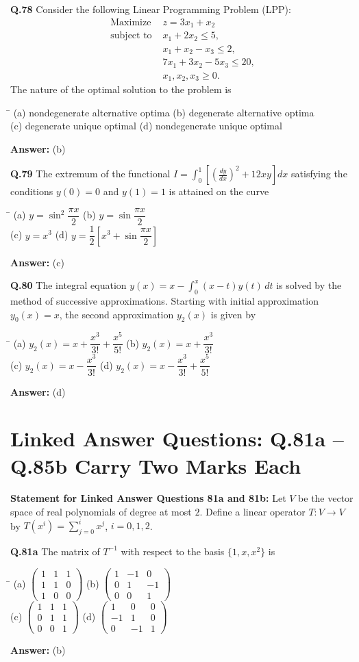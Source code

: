 \documentclass[11pt,a4paper]{article}
\newcommand{\optsfour}[4]{%
  \begin{tabbing}
    \hspace{0.48\linewidth}\=\kill
    (a) #1 \> (b) #2 \\[2pt]
    (c) #3 \> (d) #4
  \end{tabbing}%
}
\newcommand{\ans}[1]{\textbf{Answer:} #1\par\medskip}
\begin{document}
\textbf{Q.78} Consider the following Linear Programming Problem (LPP):
\begin{align*}
  \text{Maximize } & z = 3x_1 + x_2 \\
  \text{subject to } & x_1 + 2x_2 \le 5, \\
                     & x_1 + x_2 - x_3 \le 2, \\
                     & 7x_1 + 3x_2 - 5x_3 \le 20, \\
                     & x_1, x_2, x_3 \ge 0.
\end{align*}
The nature of the optimal solution to the problem is
\optsfour{nondegenerate alternative optima}{degenerate alternative optima}{degenerate unique optimal}{nondegenerate unique optimal}
\ans{(b)}

\textbf{Q.79} The extremum of the functional $I = \displaystyle\int_0^1 \left[\left(\frac{dy}{dx}\right)^2 + 12xy\right]dx$ satisfying the conditions $y(0) = 0$ and $y(1) = 1$ is attained on the curve
\optsfour{$y = \sin^2\dfrac{\pi x}{2}$}{$y = \sin\dfrac{\pi x}{2}$}{$y = x^3$}{$y = \dfrac{1}{2}\left[x^3 + \sin\dfrac{\pi x}{2}\right]$}
\ans{(c)}

\textbf{Q.80} The integral equation $y(x) = x - \displaystyle\int_0^x (x - t)y(t)\,dt$ is solved by the method of successive approximations. Starting with initial approximation $y_0(x) = x$, the second approximation $y_2(x)$ is given by
\optsfour{$y_2(x) = x + \dfrac{x^3}{3!} + \dfrac{x^5}{5!}$}{$y_2(x) = x + \dfrac{x^3}{3!}$}{$y_2(x) = x - \dfrac{x^3}{3!}$}{$y_2(x) = x - \dfrac{x^3}{3!} + \dfrac{x^5}{5!}$}
\ans{(d)}

\section*{Linked Answer Questions: Q.81a -- Q.85b Carry Two Marks Each}

\textbf{Statement for Linked Answer Questions 81a and 81b:}
Let $V$ be the vector space of real polynomials of degree at most $2$. Define a linear operator $T : V \to V$ by $T(x^i) = \displaystyle\sum_{j=0}^{i} x^j$, $i = 0, 1, 2$.

\textbf{Q.81a} The matrix of $T^{-1}$ with respect to the basis $\{1, x, x^2\}$ is
\optsfour{$\begin{pmatrix} 1 & 1 & 1 \\ 1 & 1 & 0 \\ 1 & 0 & 0 \end{pmatrix}$}{$\begin{pmatrix} 1 & -1 & 0 \\ 0 & 1 & -1 \\ 0 & 0 & 1 \end{pmatrix}$}{$\begin{pmatrix} 1 & 1 & 1 \\ 0 & 1 & 1 \\ 0 & 0 & 1 \end{pmatrix}$}{$\begin{pmatrix} 1 & 0 & 0 \\ -1 & 1 & 0 \\ 0 & -1 & 1 \end{pmatrix}$}
\ans{(b)}
\end{document}
